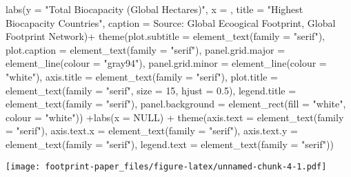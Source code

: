 \documentclass[
]{article}
\newenvironment{Shaded}{\begin{snugshade}}{\end{snugshade}}
\newcommand{\AttributeTok}[1]{\textcolor[rgb]{0.77,0.63,0.00}{#1}}
\newcommand{\ConstantTok}[1]{\textcolor[rgb]{0.00,0.00,0.00}{#1}}
\newcommand{\DecValTok}[1]{\textcolor[rgb]{0.00,0.00,0.81}{#1}}
\newcommand{\FloatTok}[1]{\textcolor[rgb]{0.00,0.00,0.81}{#1}}
\newcommand{\FunctionTok}[1]{\textcolor[rgb]{0.00,0.00,0.00}{#1}}
\newcommand{\NormalTok}[1]{#1}
\newcommand{\SpecialCharTok}[1]{\textcolor[rgb]{0.00,0.00,0.00}{#1}}
\newcommand{\StringTok}[1]{\textcolor[rgb]{0.31,0.60,0.02}{#1}}
\begin{document}
\begin{Shaded}
\begin{Highlighting}[]
  \FunctionTok{labs}\NormalTok{(}\AttributeTok{y =} \StringTok{"Total Biocapacity (Global Hectares)"}\NormalTok{,}
       \AttributeTok{x =} \StringTok{\textquotesingle{}\textquotesingle{}}\NormalTok{,}
       \AttributeTok{title =} \StringTok{"Highest Biocapacity Countries"}\NormalTok{,}
       \AttributeTok{caption =} \StringTok{\textquotesingle{}Source: Global Ecoogical Footprint, Global Footprint Network\textquotesingle{}}\NormalTok{)}\SpecialCharTok{+}
    \FunctionTok{theme}\NormalTok{(}\AttributeTok{plot.subtitle =} \FunctionTok{element\_text}\NormalTok{(}\AttributeTok{family =} \StringTok{"serif"}\NormalTok{),}
    \AttributeTok{plot.caption =} \FunctionTok{element\_text}\NormalTok{(}\AttributeTok{family =} \StringTok{"serif"}\NormalTok{),}
    \AttributeTok{panel.grid.major =} \FunctionTok{element\_line}\NormalTok{(}\AttributeTok{colour =} \StringTok{"gray94"}\NormalTok{),}
    \AttributeTok{panel.grid.minor =} \FunctionTok{element\_line}\NormalTok{(}\AttributeTok{colour =} \StringTok{"white"}\NormalTok{),}
    \AttributeTok{axis.title =} \FunctionTok{element\_text}\NormalTok{(}\AttributeTok{family =} \StringTok{"serif"}\NormalTok{),}
    \AttributeTok{plot.title =} \FunctionTok{element\_text}\NormalTok{(}\AttributeTok{family =} \StringTok{"serif"}\NormalTok{,}
        \AttributeTok{size =} \DecValTok{15}\NormalTok{, }\AttributeTok{hjust =} \FloatTok{0.5}\NormalTok{), }\AttributeTok{legend.title =} \FunctionTok{element\_text}\NormalTok{(}\AttributeTok{family =} \StringTok{"serif"}\NormalTok{),}
    \AttributeTok{panel.background =} \FunctionTok{element\_rect}\NormalTok{(}\AttributeTok{fill =} \StringTok{"white"}\NormalTok{,}
        \AttributeTok{colour =} \StringTok{"white"}\NormalTok{)) }\SpecialCharTok{+}\FunctionTok{labs}\NormalTok{(}\AttributeTok{x =} \ConstantTok{NULL}\NormalTok{) }\SpecialCharTok{+} \FunctionTok{theme}\NormalTok{(}\AttributeTok{axis.text =} \FunctionTok{element\_text}\NormalTok{(}\AttributeTok{family =} \StringTok{"serif"}\NormalTok{),}
    \AttributeTok{axis.text.x =} \FunctionTok{element\_text}\NormalTok{(}\AttributeTok{family =} \StringTok{"serif"}\NormalTok{),}
    \AttributeTok{axis.text.y =} \FunctionTok{element\_text}\NormalTok{(}\AttributeTok{family =} \StringTok{"serif"}\NormalTok{),}
    \AttributeTok{legend.text =} \FunctionTok{element\_text}\NormalTok{(}\AttributeTok{family =} \StringTok{"serif"}\NormalTok{))}
\end{Highlighting}
\end{Shaded}

\texttt{[image: footprint-paper\_files/figure-latex/unnamed-chunk-4-1.pdf]}
\end{document}
